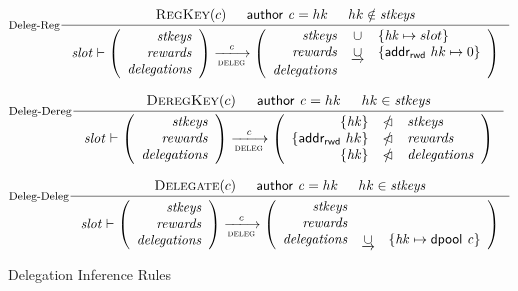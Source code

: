 \begin{figure}
  \centering
  \begin{equation}\label{eq:deleg-reg}
    \inference[Deleg-Reg]
    {
      \RegKey{c} & \cauthor{c} = hk & hk \notin \var{stkeys}
    }
    {
      \var{slot} \vdash
      \left(
      \begin{array}{r}
        \var{stkeys} \\
        \var{rewards} \\
        \var{delegations}
      \end{array}
      \right)
      \trans{deleg}{\var{c}}
      \left(
      \begin{array}{rcl}
        \var{stkeys} & \union & \{\var{hk} \mapsto slot\}\\
        \var{rewards} & \unionoverride & \{\addrRw \var{hk} \mapsto 0\}\\
        \var{delegations}
      \end{array}
      \right)
    }
  \end{equation}

  \begin{equation}\label{eq:deleg-dereg}
    \inference[Deleg-Dereg]
    {
      \DeregKey{c} & \cauthor{c} = hk & hk \in \var{stkeys}
    }
    {
      \var{slot} \vdash
      \left(
      \begin{array}{r}
        \var{stkeys} \\
        \var{rewards} \\
        \var{delegations}
      \end{array}
      \right)
      \trans{deleg}{\var{c}}
      \left(
      \begin{array}{rcl}
        \{\var{hk}\} & \subtractdom & \var{stkeys}\\
        \{\addrRw \var{hk}\} & \subtractdom & \var{rewards} \\
        \{\var{hk}\} & \subtractdom & \var{delegations}
      \end{array}
      \right)
    }
  \end{equation}

  \begin{equation}\label{eq:deleg-deleg}
    \inference[Deleg-Deleg]
    {
      \Delegate{c} & \cauthor{c} = hk & hk \in \var{stkeys}
    }
    {
      \var{slot} \vdash
      \left(
      \begin{array}{r}
        \var{stkeys} \\
        \var{rewards} \\
        \var{delegations}
      \end{array}
      \right)
      \trans{deleg}{c}
      \left(
      \begin{array}{rcl}
        \var{stkeys} \\
        \var{rewards} \\
        \var{delegations} & \unionoverride & \{\var{hk} \mapsto \dpool c\}
      \end{array}
      \right)
    }
  \end{equation}
  \caption{Delegation Inference Rules}
  \label{fig:delegation-rules}
\end{figure}


